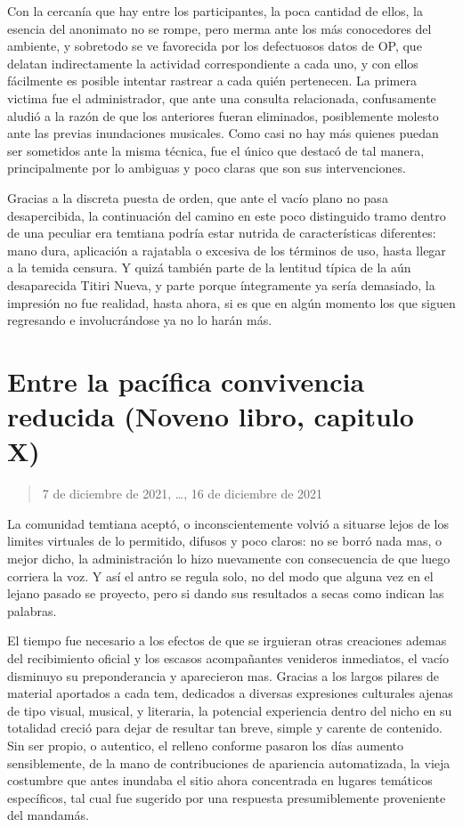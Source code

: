 \documentclass[
]{book}
\begin{document}
Con la cercanía que hay entre los participantes, la poca cantidad de ellos, la esencia del anonimato no se rompe, pero merma ante los más conocedores del ambiente, y sobretodo se ve favorecida por los defectuosos datos de OP, que delatan indirectamente la actividad correspondiente a cada uno, y con ellos fácilmente es posible intentar rastrear a cada quién pertenecen. La primera victima fue el administrador, que ante una consulta relacionada, confusamente aludió a la razón de que los anteriores fueran eliminados, posiblemente molesto ante las previas inundaciones musicales. Como casi no hay más quienes puedan ser sometidos ante la misma técnica, fue el único que destacó de tal manera, principalmente por lo ambiguas y poco claras que son sus intervenciones.

Gracias a la discreta puesta de orden, que ante el vacío plano no pasa desapercibida, la continuación del camino en este poco distinguido tramo dentro de una peculiar era temtiana podría estar nutrida de características diferentes: mano dura, aplicación a rajatabla o excesiva de los términos de uso, hasta llegar a la temida censura. Y quizá también parte de la lentitud típica de la aún desaparecida Titiri Nueva, y parte porque íntegramente ya sería demasiado, la impresión no fue realidad, hasta ahora, si es que en algún momento los que siguen regresando e involucrándose ya no lo harán más.

\hypertarget{entre-la-pacuxedfica-convivencia-reducida-noveno-libro-capitulo-x}{%
\section{Entre la pacífica convivencia reducida (Noveno libro, capitulo X)}\label{entre-la-pacuxedfica-convivencia-reducida-noveno-libro-capitulo-x}}

\begin{quote}
7 de diciembre de 2021, \ldots, 16 de diciembre de 2021
\end{quote}

La comunidad temtiana aceptó, o inconscientemente volvió a situarse lejos de los limites virtuales de lo permitido, difusos y poco claros: no se borró nada mas, o mejor dicho, la administración lo hizo nuevamente con consecuencia de que luego corriera la voz. Y así el antro se regula solo, no del modo que alguna vez en el lejano pasado se proyecto, pero si dando sus resultados a secas como indican las palabras.

El tiempo fue necesario a los efectos de que se irguieran otras creaciones ademas del recibimiento oficial y los escasos acompañantes venideros inmediatos, el vacío disminuyo su preponderancia y aparecieron mas. Gracias a los largos pilares de material aportados a cada tem, dedicados a diversas expresiones culturales ajenas de tipo visual, musical, y literaria, la potencial experiencia dentro del nicho en su totalidad creció para dejar de resultar tan breve, simple y carente de contenido. Sin ser propio, o autentico, el relleno conforme pasaron los días aumento sensiblemente, de la mano de contribuciones de apariencia automatizada, la vieja costumbre que antes inundaba el sitio ahora concentrada en lugares temáticos específicos, tal cual fue sugerido por una respuesta presumiblemente proveniente del mandamás.
\end{document}
